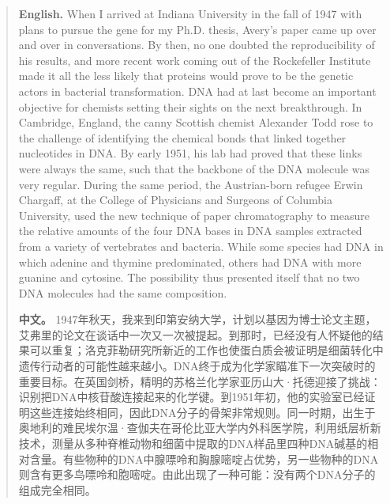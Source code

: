 \begin{quote}
\noindent\textbf{English.} When I arrived at Indiana University in the fall of 1947 with plans to pursue the gene for my Ph.D. thesis, Avery's paper came up over and over in conversations. By then, no one doubted the reproducibility of his results, and more recent work coming out of the Rockefeller Institute made it all the less likely that proteins would prove to be the genetic actors in bacterial transformation. DNA had at last become an important objective for chemists setting their sights on the next breakthrough. In Cambridge, England, the canny Scottish chemist Alexander Todd rose to the challenge of identifying the chemical bonds that linked together nucleotides in DNA. By early 1951, his lab had proved that these links were always the same, such that the backbone of the DNA molecule was very regular. During the same period, the Austrian-born refugee Erwin Chargaff, at the College of Physicians and Surgeons of Columbia University, used the new technique of paper chromatography to measure the relative amounts of the four DNA bases in DNA samples extracted from a variety of vertebrates and bacteria. While some species had DNA in which adenine and thymine predominated, others had DNA with more guanine and cytosine. The possibility thus presented itself that no two DNA molecules had the same composition.

\smallskip
\noindent\textbf{中文。} 1947年秋天，我来到印第安纳大学，计划以基因为博士论文主题，艾弗里的论文在谈话中一次又一次被提起。到那时，已经没有人怀疑他的结果可以重复；洛克菲勒研究所新近的工作也使蛋白质会被证明是细菌转化中遗传行动者的可能性越来越小。DNA终于成为化学家瞄准下一次突破时的重要目标。在英国剑桥，精明的苏格兰化学家亚历山大·托德迎接了挑战：识别把DNA中核苷酸连接起来的化学键。到1951年初，他的实验室已经证明这些连接始终相同，因此DNA分子的骨架非常规则。同一时期，出生于奥地利的难民埃尔温·查伽夫在哥伦比亚大学内外科医学院，利用纸层析新技术，测量从多种脊椎动物和细菌中提取的DNA样品里四种DNA碱基的相对含量。有些物种的DNA中腺嘌呤和胸腺嘧啶占优势，另一些物种的DNA则含有更多鸟嘌呤和胞嘧啶。由此出现了一种可能：没有两个DNA分子的组成完全相同。
\end{quote}

